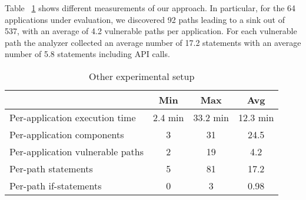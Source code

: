 

Table ~\ref{table:other_experimental} shows different measurements of our approach. In particular, for the 64 applications under evaluation, we discovered 92 paths leading to a sink out of 537, with an average of 4.2 vulnerable paths per application. For each vulnerable path the analyzer collected an average number of 17.2 statements with an average number of 5.8 statements including API calls.
\setlength{\belowcaptionskip}{-5pt}
\begin{table}[h]
  \centering
  \begin{tabular}{|l|c|c|c|}
    \hline
    & Min & Max & Avg \\ \hline
    Per-application execution time & 2.4 min & 33.2 min & 12.3 min \\
    Per-application components & 3 & 31 & 24.5 \\
    Per-application vulnerable paths & 2 & 19 & 4.2 \\
    Per-path statements & 5 & 81 & 17.2 \\
    Per-path if-statements & 0 & 3 & 0.98 \\
    \hline
  \end{tabular}
  \caption{Other experimental setup}
  \label{table:other_experimental}
\end{table}


